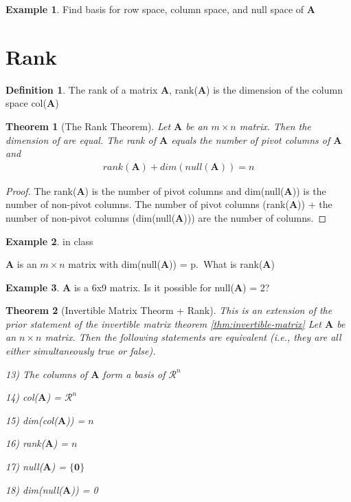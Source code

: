 \documentclass[
]{book}
\newtheorem{theorem}{Theorem}[chapter]
\theoremstyle{definition}
\newtheorem{definition}{Definition}[chapter]
\theoremstyle{definition}
\newtheorem{example}{Example}[chapter]
\theoremstyle{definition}
\theoremstyle{definition}
\theoremstyle{remark}
\begin{document}
\begin{example}
Find basis for row space, column space, and null space of \(\mathbf{A}\)
\end{example}

\hypertarget{rank-2}{%
\section{Rank}\label{rank-2}}

\begin{definition}
The rank of a matrix \(\mathbf{A}\), rank(\(\mathbf{A}\)) is the dimension of the column space col(\(\mathbf{A}\))
\end{definition}

\begin{theorem}[The Rank Theorem]
Let \(\mathbf{A}\) be an \(m \times n\) matrix. Then the dimension of are equal. The rank of \(\mathbf{A}\) equals the number of pivot columns of \(\mathbf{A}\) and
\[
\begin{aligned}
rank (\mathbf{A}) + dim(null(\mathbf{A})) = n
\end{aligned}
\]
\end{theorem}

\begin{proof}
The rank(\(\mathbf{A}\)) is the number of pivot columns and dim(null(\(\mathbf{A}\))) is the number of non-pivot columns. The number of pivot columns (rank(\(\mathbf{A}\))) + the number of non-pivot columns (dim(null(\(\mathbf{A}\)))) are the number of columns.
\end{proof}

\begin{example}
in class

\(\mathbf{A}\) is an \(m \times n\) matrix with dim(null(\(\mathbf{A}\))) = p.~What is rank(\(\mathbf{A}\))
\end{example}

\begin{example}
\(\mathbf{A}\) is a 6x9 matrix. Is it possible for null(\(\mathbf{A}\)) = 2?
\end{example}

\begin{theorem}[Invertible Matrix Theorm + Rank]
This is an extension of the prior statement of the invertible matrix theorem \ref{thm:invertible-matrix}
Let \(\mathbf{A}\) be an \(n \times n\) matrix. Then the following statements are equivalent (i.e., they are all either simultaneously true or false).

13) The columns of \(\mathbf{A}\) form a basis of \(\mathcal{R}^n\)

14) col(\(\mathbf{A}\)) = \(\mathcal{R}^n\)

15) dim(col(\(\mathbf{A}\))) = \(n\)

16) rank(\(\mathbf{A}\)) = \(n\)

17) null(\(\mathbf{A}\)) = \(\{\mathbf{0}\}\)

18) dim(null(\(\mathbf{A}\))) = 0
\end{theorem}
\end{document}
